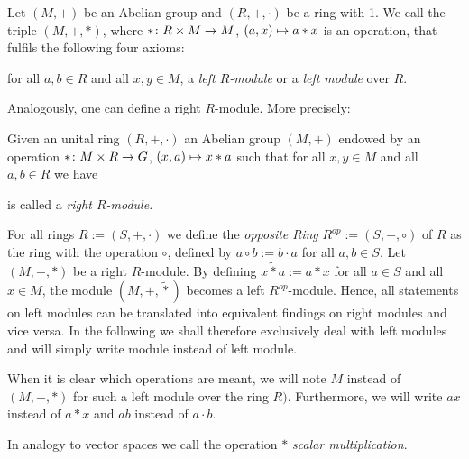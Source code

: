 \begin{defin} Let $(M,+)$ be an Abelian group and $(R,+,\cdot)$ be a ring with 1. We call the triple $(M,+,\ast)$, where $\ast\colon R\times M\rightarrow M$, $(a,x)\mapsto a\ast x$ is an operation, that fulfils the following four axioms:
\begin{multienumerate}
\end{multienumerate}
for all $a,b \in R$ and all $x,y \in M$, a \emph{left $R$-module} or a \textit{left module} over $R$.
\end{defin}

Analogously, one can define a right $R$-module. More precisely:

Given an unital ring $(R,+,\cdot)$ an Abelian group $(M,+)$ endowed by an operation $\ast\colon M \times R \rightarrow G$, $(x,a)\mapsto x\ast a$ such that for all $x,y\in M$ and all $a,b\in R$ we have
\begin{multienumerate}
\end{multienumerate}
is called a \emph{right $R$-module.}

\begin{rem}
\begin{exlist}
\item For all rings $R:=(S,+,\cdot)$ we define the \textit{opposite Ring} $R^{op}:=(S,+,\circ)$ of $R$ as the ring with the operation $\circ$, defined by $a\circ b:= b\cdot a$ for all $a,b \in S$. Let $(M,+,\ast)$ be a right $R$-module.
By defining $x\tilde{\ast}a:=a\ast x$ for all $a\in S$ and all $x\in M$, the module $(M,+,\tilde{\ast})$ becomes a left $R^{op}$-module.
Hence, all statements on left modules can be translated into equivalent findings on right modules and vice versa.
In the following we shall therefore exclusively deal with left modules and will simply write module instead of left module.
\item When it is clear which operations are meant, we will note $M$ instead of $(M,+,\ast)$ for such a left module over the ring $R)$.
Furthermore, we will write $ax$ instead of $a\ast x$ and $ab$ instead of $a\cdot b$.
\item In analogy to vector spaces we call the operation $\ast$ \emph{scalar multiplication}.
\end{exlist}
\end{rem}

